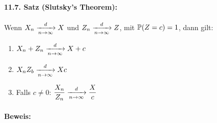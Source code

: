 \documentclass[11pt]{report}
\begin{document}
\paragraph{11.7. Satz (Slutsky's Theorem):} Wenn $X_n\nto{d}{n\to\infty}X$ und $Z_n\nto{d}{n\to\infty}Z$, mit $\mathbb{P}(Z=c)=1$, dann gilt:
\begin{enumerate}[label=(\roman*)]
    \item $X_n+Z_n\nto{d}{n\to\infty}X+c$
    \item $X_nZ_b\nto{d}{n\to\infty}Xc$
    \item Falls $c\neq0$: $\displaystyle\frac{X_n}{Z_n}\nto{d}{n\to\infty}\frac{X}{c}$
\end{enumerate}

\paragraph{Beweis:}
\end{document}
